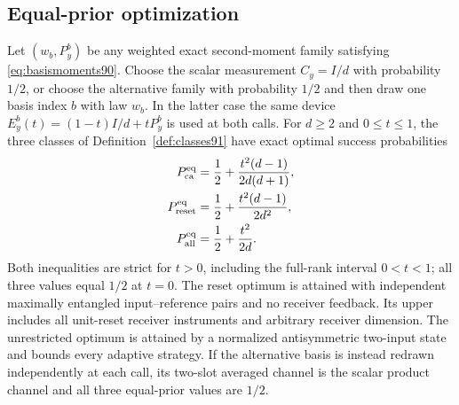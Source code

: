 \subsection{Equal-prior optimization}
\begin{theorem}\label{thm:equalprior91}
Let $(w_b,P_y^b)$ be any weighted exact second-moment family satisfying
\eqref{eq:basismoments90}.  Choose the scalar measurement $C_y=I/d$
with probability $1/2$, or choose the alternative family with probability
$1/2$ and then draw one basis index $b$ with law $w_b$.  In the latter
case the same device $E_y^b(t)=(1-t)I/d+tP_y^b$ is used at both calls.
For $d\ge2$ and $0\le t\le1$, the three classes of
Definition~\ref{def:classes91} have exact optimal success probabilities
\begin{equation}\label{eq:equalprior91}
 \begin{split}
 P_{\rm ca}^{\rm eq}&=\frac12+\frac{t^2(d-1)}{2d(d+1)},\\
 P_{\rm reset}^{\rm eq}&=\frac12+\frac{t^2(d-1)}{2d^2},\\
 P_{\rm all}^{\rm eq}&=\frac12+\frac{t^2}{2d}.
 \end{split}
\end{equation}
Both inequalities are strict for $t>0$, including the full-rank interval
$0<t<1$; all three values equal $1/2$ at $t=0$.
The reset optimum is attained with independent maximally entangled
input--reference pairs and no receiver feedback.  Its upper includes
all unit-reset receiver instruments and arbitrary receiver dimension.
The unrestricted optimum is attained by a normalized antisymmetric
two-input state and bounds every adaptive strategy.
If the alternative basis is instead redrawn independently at each
call, its two-slot averaged channel is the scalar product channel and
all three equal-prior values are $1/2$.
\end{theorem}
